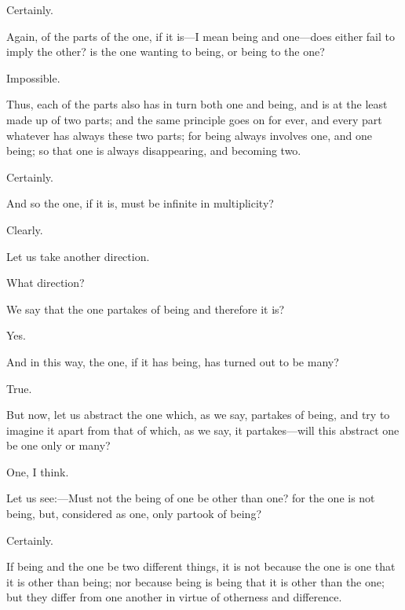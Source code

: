 \documentclass[11pt,letter]{article}
\begin{document}
\par  Certainly.

\par  Again, of the parts of the one, if it is—I mean being and one—does either fail to imply the other? is the one wanting to being, or being to the one?

\par  Impossible.

\par  Thus, each of the parts also has in turn both one and being, and is at the least made up of two parts; and the same principle goes on for ever, and every part whatever has always these two parts; for being always involves one, and one being; so that one is always disappearing, and becoming two.

\par  Certainly.

\par  And so the one, if it is, must be infinite in multiplicity?

\par  Clearly.

\par  Let us take another direction.

\par  What direction?

\par  We say that the one partakes of being and therefore it is?

\par  Yes.

\par  And in this way, the one, if it has being, has turned out to be many?

\par  True.

\par  But now, let us abstract the one which, as we say, partakes of being, and try to imagine it apart from that of which, as we say, it partakes—will this abstract one be one only or many?

\par  One, I think.

\par  Let us see:—Must not the being of one be other than one? for the one is not being, but, considered as one, only partook of being?

\par  Certainly.

\par  If being and the one be two different things, it is not because the one is one that it is other than being; nor because being is being that it is other than the one; but they differ from one another in virtue of otherness and difference.
\end{document}
